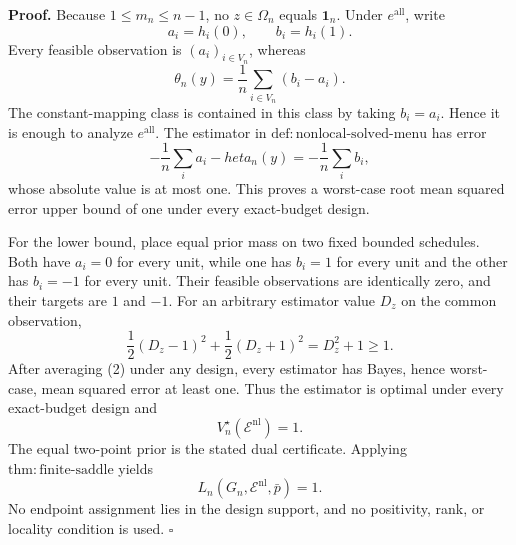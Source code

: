 \textbf{Proof.}
Because \(1\le m_n\le n-1\), no \(z\in\Omega_n\) equals \(\mathbf 1_n\).  Under \(e^{\mathrm{all}}\), write
\[
 a_i=h_i(0),\qquad b_i=h_i(1).
\]
Every feasible observation is \((a_i)_{i\in V_n}\), whereas
\[
 \theta_n(y)=\frac1n\sum_{i\in V_n}(b_i-a_i). \tag{1}
\]
The constant-mapping class is contained in this class by taking \(b_i=a_i\).  Hence it is enough to analyze \(e^{\mathrm{all}}\).  The estimator in \(\mathrm{def{:}nonlocal\text{-}solved\text{-}menu}\) has error
\[
 -\frac1n\sum_i a_i-  heta_n(y)
 =-\frac1n\sum_i b_i,
\]
whose absolute value is at most one.  This proves a worst-case root mean squared error upper bound of one under every exact-budget design.

For the lower bound, place equal prior mass on two fixed bounded schedules.  Both have \(a_i=0\) for every unit, while one has \(b_i=1\) for every unit and the other has \(b_i=-1\) for every unit.  Their feasible observations are identically zero, and their targets are \(1\) and \(-1\).  For an arbitrary estimator value \(D_z\) on the common observation,
\[
 \frac12(D_z-1)^2+\frac12(D_z+1)^2=D_z^2+1\ge1. \tag{2}
\]
After averaging (2) under any design, every estimator has Bayes, hence worst-case, mean squared error at least one.  Thus the estimator is optimal under every exact-budget design and
\[
 V_n^\star(\mathcal E^{\mathrm{nl}})=1.
\]
The equal two-point prior is the stated dual certificate.  Applying \(\mathrm{thm{:}finite\text{-}saddle}\) yields
\[
 L_n(G_n,\mathcal E^{\mathrm{nl}},\bar p)=1.
\]
No endpoint assignment lies in the design support, and no positivity, rank, or locality condition is used. \(\square\)